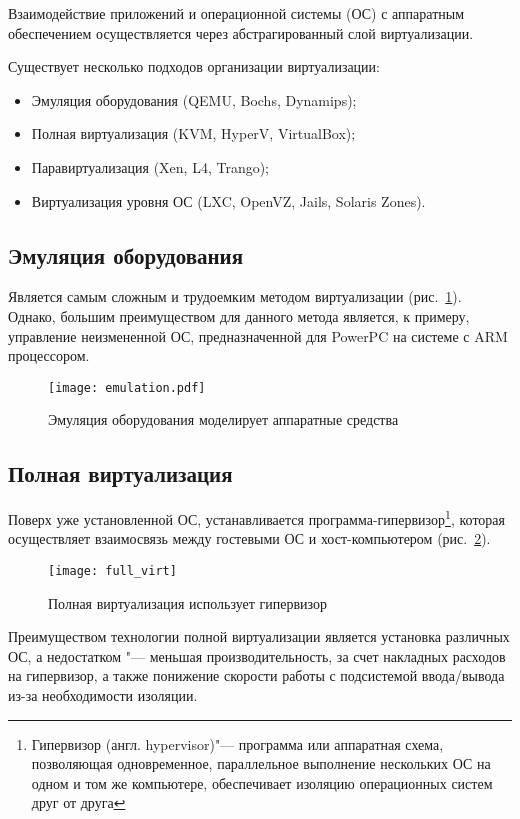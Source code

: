Взаимодействие приложений и операционной системы (ОС) с аппаратным обеспечением осуществляется через абстрагированный слой виртуализации. 

Существует несколько подходов организации виртуализации:
\begin{itemize}
    \item Эмуляция оборудования (QEMU, Bochs, Dynamips);
    \item Полная виртуализация (KVM, HyperV, VirtualBox);
    \item Паравиртуализация (Xen, L4, Trango);
    \item Виртуализация уровня ОС (LXC, OpenVZ, Jails, Solaris Zones).
\end{itemize}

\subsection{Эмуляция оборудования}
Является самым сложным и трудоемким методом виртуализации (рис.~\ref{pic:emulation}).
Однако, большим преимуществом для данного метода является, к примеру, управление неизмененной ОС, предназначенной для PowerPC на системе с ARM процессором.
\begin{figure}[ht]
    \centering
	\texttt{[image: emulation.pdf]}
	\caption{Эмуляция оборудования моделирует аппаратные средства}\label{pic:emulation}
\end{figure}

\subsection{Полная виртуализация}
Поверх уже установленной ОС, устанавливается программа-гипервизор\footnote{Гипервизор (англ. hypervisor)"--- программа или аппаратная схема, позволяющая одновременное, параллельное выполнение нескольких ОС на одном и том же компьютере, обеспечивает изоляцию операционных систем друг от друга}, которая осуществляет взаимосвязь между гостевыми ОС и хост-компьютером (рис.~\ref{pic:full_virt}).
\begin{figure}[ht]
    \centering
	\texttt{[image: full\_virt]}
	\caption{Полная виртуализация использует гипервизор}\label{pic:full_virt}
\end{figure}

Преимуществом технологии полной виртуализации является установка различных ОС, а недостатком "--- меньшая производительность, за счет накладных расходов на гипервизор, а также понижение скорости работы с подсистемой ввода/вывода из-за необходимости изоляции.

